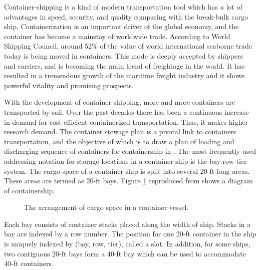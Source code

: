 \documentclass[review,3p,times,authoryear,12pt]{elsarticle}
\begin{document}
Container-shipping is a kind of modern transportation tool which has a lot of advantages in speed, security, and quality comparing with the break-bulk cargo ship.
Containerization is an important driver of the global economy, and the container has become a mainstay of worldwide trade.
According to World Shipping Council, around 52\% of the value of world international seaborne trade today is being moved in containers.
This mode is deeply accepted by shippers and carriers, and is becoming the main trend of freightage in the world.
It has resulted in a tremendous growth of the maritime freight industry and it shows powerful vitality and promising prospects.

With the development of container-shipping, more and more containers are transported by sail.
Over the past decades there has been a continuous increase in demand for cost efficient containerized transportation.
Thus, it makes higher research demand.
The container stowage plan is a pivotal link to containers transportation, and the objective of which is to draw a plan of loading and discharging sequence of containers for containership in \cite{zhang2008review}.
The most frequently used addressing notation for storage locations in a container ship is the bay-row-tier system.
The cargo space of a container ship is split into several 20-ft-long areas.
These areas are termed as 20-ft bays. Figure \ref{fig 1:graph} reproduced from \cite{delgado2012constraint} shows a diagram of containership.
\begin{figure}[htbp]
\center
\setlength{\abovecaptionskip}{10pt}
\caption{The arrangement of cargo space in a container vessel.}
\label{fig 1:graph}
\end{figure}

Each bay consists of container stacks placed along the width of ship.
Stacks in a bay are indexed by a row number.
The position for one 20-ft container in the ship is uniquely indexed by (bay, row, tier), called a slot.
In addition, for some ships, two contiguous 20-ft bays form a 40-ft bay which can be used to accommodate 40-ft containers.
\end{document}
